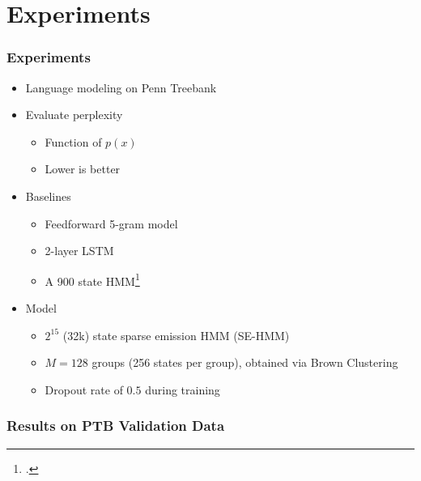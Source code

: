 \documentclass{beamer}
\begin{document}
\section{Experiments}
\begin{frame}
\frametitle{Experiments}
\begin{itemize}
\item Language modeling on Penn Treebank
\vspace{1em}
\item Evaluate perplexity
    \begin{itemize}
    \item Function of $p(x)$
    \item Lower is better
    \end{itemize}
\vspace{1em}
\item Baselines
    \begin{itemize}
    \item Feedforward 5-gram model
    \item 2-layer LSTM
    \item A 900 state HMM\footcite{buys2018hmm}
    \end{itemize}
\vspace{1em}
\item Model
    \begin{itemize}
    \item $2^{15}$ (32k) state sparse emission HMM (SE-HMM)
    \item $M=128$ groups (256 states per group), obtained via Brown Clustering
    \item Dropout rate of $0.5$ during training
    \end{itemize}
\end{itemize}
\end{frame}

\begin{frame}
\frametitle{Results on PTB Validation Data}
\centering
{}
\end{frame}
\end{document}
